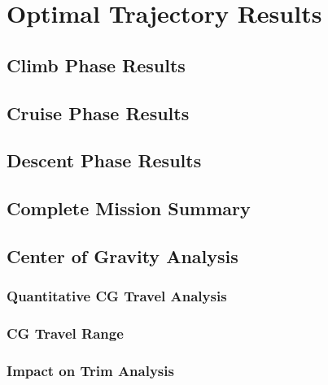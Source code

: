 \documentclass[12pt, a4paper]{report}
\begin{document}
\section{Optimal Trajectory Results}



\subsection{Climb Phase Results}


\subsection{Cruise Phase Results}


\subsection{Descent Phase Results}


\subsection{Complete Mission Summary}




\subsection{Center of Gravity Analysis}

\subsubsection{Quantitative CG Travel Analysis}


\subsubsection{CG Travel Range}


\subsubsection{Impact on Trim Analysis}

\end{document}
